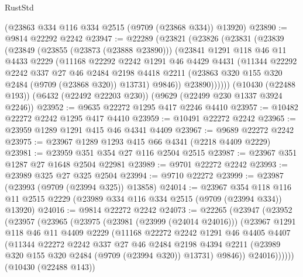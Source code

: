 \begin{lexlean}{RustStd}
\begin{coremodule}
    (@23863 @334 @116 @334 @2515 (@9709 (@23868 @334)) @13920)
@23890 := @9814 @22292 @2242
@23947 := @22289
    (@23821
      (@23826
        (@23831
          (@23839
            (@23849
              (@23855 (@23873 (@23888 @23890)))
              (@23841
                @1291
                @118
                @46
                @11
                @4433
                @2229
                (@11168
                  @22292
                  @2242
                  @1291
                  @46
                  @4429
                  @4431
                  (@11344
                    @22292
                    @2242
                    @337
                    @27
                    @46
                    @2484
                    @2198
                    @4418
                    @2211
                    (@23863 @320 @155 @320 @2484 (@9709 (@23868 @320)) @13731)
                    @9846))
                @23890))))))
    (@10430 (@22488 @193))
    (@6432 (@22492 @22203 @230))
    (@9629 (@22499 @230 @1337 @3924 @2246))
@23952 := @9635 @22272 @1295 @417 @2246 @4410
@23957 := @10482 @22272 @2242 @1295 @417 @4410
@23959 := @10491 @22272 @2242
@23965 := @23959 @1289 @1291 @415 @46 @4341 @4409
@23967 := @9689 @22272 @2242
@23975 := @23967 @1289 @1293 @415 @66 @4341 (@2218 @4409 @2229)
@23981 := @23959 @351 @354 @27 @116 @2504 @2515
@23987 := @23967 @351 @1287 @27 @1648 @2504 @22981
@23989 := @9701 @22272 @2242
@23993 := @23989 @325 @27 @325 @2504
@23994 := @9710 @22272
@23999 := @23987 (@23993 (@9709 (@23994 @325)) @13858)
@24014 := @23967
    @354
    @118
    @116
    @11
    @2515
    @2229
    (@23989 @334 @116 @334 @2515 (@9709 (@23994 @334)) @13920)
@24016 := @9814 @22272 @2242
@24073 := @22265
    (@23947
      (@23952
        (@23957
          (@23965
            (@23975
              (@23981 (@23999 (@24014 @24016)))
              (@23967
                @1291
                @118
                @46
                @11
                @4409
                @2229
                (@11168
                  @22272
                  @2242
                  @1291
                  @46
                  @4405
                  @4407
                  (@11344
                    @22272
                    @2242
                    @337
                    @27
                    @46
                    @2484
                    @2198
                    @4394
                    @2211
                    (@23989 @320 @155 @320 @2484 (@9709 (@23994 @320)) @13731)
                    @9846))
                @24016))))))
    (@10430 (@22488 @143))

\end{coremodule}
\end{lexlean}
